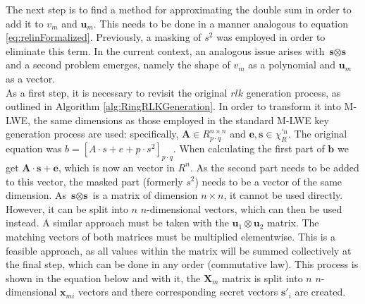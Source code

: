 The next step is to find a method for approximating the double sum in order to add it to $v_m$ and $\textbf{u}_m$. This needs to be done in a manner analogous to equation \ref{eq:relinFormalized}. Previously, a masking of $s^2$ was employed in order to eliminate this term. In the current context, an analogous issue arises with $\textbf{s} \otimes \textbf{s}$ and a second problem emerges, namely the shape of $v_m$ as a polynomial and $\textbf{u}_m$ as a vector. \\
As a first step, it is necessary to revisit the original $rlk$ generation process, as outlined in Algorithm \ref{alg:RingRLKGeneration}. In order to transform it into M-LWE, the same dimensions as those employed in the standard M-LWE key generation process are used: specifically, $\textbf{A} \in R^{n \times n}_{p \cdot q}$ and $\textbf{e}, \textbf{s} \in \chi^{'n}_{R}$. The original equation was $b = [A\cdot s+e+p\cdot s^2]_{p \cdot q}$. When calculating the first part of $\textbf{b}$ we get $\textbf{A}\cdot \textbf{s} + \textbf{e}$, which is now an vector in $R^n$. As the second part needs to be added to this vector, the masked part (formerly $s^2$) needs to be a vector of the same dimension. As $\textbf{s} \otimes \textbf{s}$ is a matrix of dimension $n \times n$, it cannot be used directly. However, it can be split into $n$ $n$-dimensional vectors, which can then be used instead. A similar approach must be taken with the $\textbf{u}_1 \otimes \textbf{u}_2$ matrix. The matching vectors of both matrices must be multiplied elementwise. This is a feasible approach, as all values within the matrix will be summed collectively at the final step, which can be done in any order (commutative law). This process is shown in the equation below and with it, the $\textbf{X}_m$ matrix is split into $n$ $n$-dimensional $\textbf{x}_{mi}$ vectors and there corresponding secret vectors $\textbf{s}'_i$ are created.

